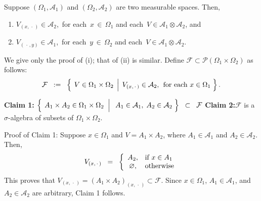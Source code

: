 \begin{theorem}
\mbox{}\vskip-0.3cm\noindent
Suppose
$\left(\Omega_{1},\mathcal{A}_{1}\right)$ and $\left(\Omega_{2},\mathcal{A}_{2}\right)$
are two measurable spaces. Then,
\begin{enumerate}
\item	$V_{(x,\,\cdot\,)} \in \mathcal{A}_{2}$,
		\,for each\, $x\,\in\,\Omega_{1}$ and each\, $V \in \mathcal{A}_{1}\otimes\mathcal{A}_{2}$, and
\item	$V_{(\,\cdot\,,y)} \in \mathcal{A}_{1}$,
		\,for each\, $y\,\in\,\Omega_{2}$ and each\, $V \in \mathcal{A}_{1}\otimes\mathcal{A}_{2}$.
\end{enumerate}
\end{theorem}
\proof
We give only the proof of (i); that of (ii) is similar.
Define $\mathcal{F} \subset \mathcal{P}\!\left(\Omega_{1}\times\Omega_{2}\right)$ as follows:
\begin{equation*}
\mathcal{F}
\;\; := \;\;
\left\{\;\left.
V \overset{{\color{white}.}}{\in} \Omega_{1}\times\Omega_{2}
\,\;\right\vert\;
V_{(x,\,\cdot\,)} \in \mathcal{A}_{2},\;\,\textnormal{for each $x\in\Omega_{1}$}
\;\right\}.
\end{equation*}
\begin{center}
\begin{minipage}{6.5in}
\noindent
\textbf{Claim 1:}\quad
	$\left\{\;
	\left.
	A_{1} \times A_{2} \overset{{\color{white}.}}{\in} \Omega_{1} \times \Omega_{2}
	\;\;\right\vert\;\;
	A_{1} \in \mathcal{A}_{1},\;
	A_{2} \in \mathcal{A}_{2}
	\;\right\}
	\;\;\subset\;\; \mathcal{F}$
\vskip 0.5cm
\noindent
\textbf{Claim 2:}\quad $\mathcal{F}$ is a $\sigma$-algebra of subsets of $\Omega_{1}\times\Omega_{2}$.
\end{minipage}
\end{center}
\vskip 0.5cm
Proof of Claim 1:\quad
Suppose $x \in \Omega_{1}$ and
$V = A_{1} \times A_{2}$, where $A_{1} \in \mathcal{A}_{1}$ and $A_{2} \in \mathcal{A}_{2}$.
Then,
\begin{equation*}
V_{(x,\,\cdot\,)}
\;\; = \;\;
\left\{\begin{array}{cl}
A_{2}, & \textnormal{if $x \in A_{1}$} \\
\varnothing, & \textnormal{otherwise}
\end{array}\right.
\end{equation*}
This proves that $V_{(x,\,\cdot\,)} = (A_{1}\times A_{2})_{(x,\,\cdot\,)} \subset \mathcal{F}$.
Since $x \in \Omega_{1}$, $A_{1} \in \mathcal{A}_{1}$, and $A_{2} \in \mathcal{A}_{2}$ are arbitrary,
Claim 1 follows.

